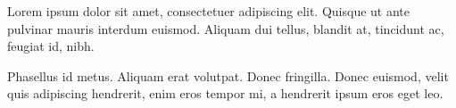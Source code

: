 \documentclass[10pt,letterpaper]{article}
\begin{document}
Lorem ipsum dolor sit amet, consectetuer adipiscing elit. Quisque ut ante
pulvinar mauris interdum euismod. Aliquam dui tellus, blandit at, tincidunt ac,
feugiat id, nibh.

Phasellus id metus. Aliquam erat volutpat. Donec fringilla. Donec euismod, velit
quis adipiscing hendrerit, enim eros tempor mi, a hendrerit ipsum eros eget leo.
\end{document}
